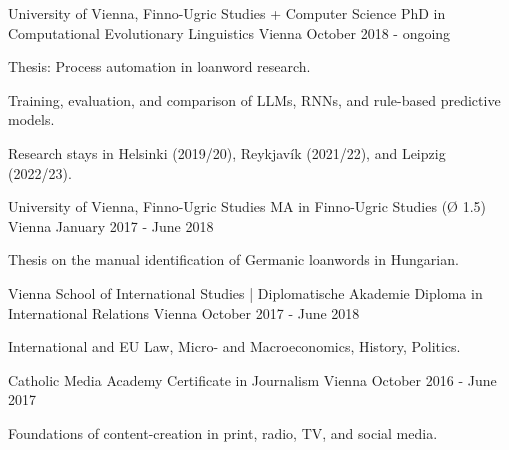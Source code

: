 

\begin{cventries}

  \cventry
    {University of Vienna, Finno-Ugric Studies + Computer Science} %
    {PhD in Computational Evolutionary Linguistics} %
    {Vienna} %
    {October 2018 - ongoing} %
    {
      \begin{cvitems} %
        \item{Thesis: Process automation in loanword research.}
        \item{Training, evaluation, and comparison of LLMs, RNNs, and rule-based predictive models.}
        \item{Research stays in Helsinki (2019/20), Reykjavík (2021/22), and Leipzig (2022/23).}
      \end{cvitems}
    }

  \cventry
    {University of Vienna, Finno-Ugric Studies} %
    {MA in Finno-Ugric Studies (Ø 1.5)} %
    {Vienna} %
    {January 2017 - June 2018} %
    {
      \begin{cvitems} %
        \item{Thesis on the manual identification of Germanic loanwords in Hungarian.}
      \end{cvitems}
    }

  \cventry
    {Vienna School of International Studies | Diplomatische Akademie} %
    {Diploma in International Relations} %
    {Vienna} %
    {October 2017 - June 2018} %
    {
    \begin{cvitems} %
        \item{International and EU Law, Micro- and Macroeconomics, History, Politics.}
      \end{cvitems}
    }

  \cventry
    {Catholic Media Academy} %
    {Certificate in Journalism} %
    {Vienna} %
    {October 2016 - June 2017} %
    {
    \begin{cvitems} %
        \item{Foundations of content-creation in print, radio, TV, and social media.}
      \end{cvitems}
    }
       

\end{cventries}
